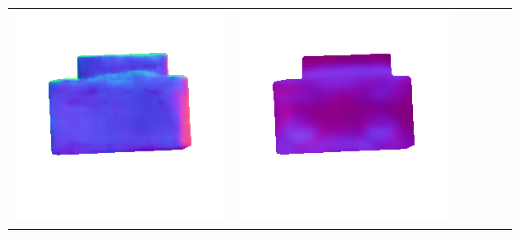\begin{tabularx}{\linewidth}{@{}Y@{}Y@{}Y@{}Y@{}Y@{}Y@{}}
\includegraphics[width=\linewidth]{semisynthetic/20150514_19_marrnet_out.png} &
\includegraphics[width=\linewidth]{semisynthetic/20150514_19_ef_out.png} \\

\end{tabularx}
